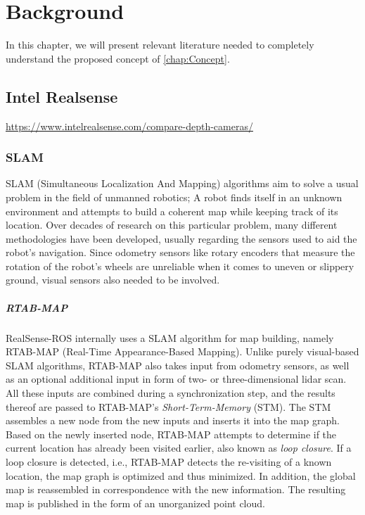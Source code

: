 \documentclass[main.tex]{subfiles}
\begin{document}
\chapter{Background}\label{chap:Background}
In this chapter, we will present relevant literature needed to completely understand the proposed concept of \autoref{chap:Concept}.


\section{Intel Realsense}
\href{https://www.intelrealsense.com/compare-depth-cameras/}{https://www.intelrealsense.com/compare-depth-cameras/}


\subsection*{SLAM}
SLAM (Simultaneous Localization And Mapping) algorithms aim to solve a usual problem in the field of unmanned robotics;
A robot finds itself in an unknown environment and attempts to build a coherent map while keeping track of its location.
Over decades of research on this particular problem, many different methodologies have been developed, usually regarding the sensors used to aid the robot's navigation.
Since odometry sensors like rotary encoders that measure the rotation of the robot's wheels are unreliable when it comes to uneven or slippery ground, visual sensors also needed to be involved.

\paragraph*{RTAB-MAP}
RealSense-ROS internally uses a SLAM algorithm for map building, namely RTAB-MAP (Real-Time Appearance-Based Mapping)\cite{Labbé_Michaud_2019}.
Unlike purely visual-based SLAM algorithms, RTAB-MAP also takes input from odometry sensors, as well as an optional additional input in form of two- or three-dimensional
lidar scan.
All these inputs are combined during a synchronization step, and the results thereof are passed to RTAB-MAP's \textit{Short-Term-Memory} (STM).
The STM assembles a new node from the new inputs and inserts it into the map graph. Based on the newly inserted node, RTAB-MAP attempts to determine if the current location has already been visited earlier, also known as \textit{loop closure}.
If a loop closure is detected, i.e., RTAB-MAP detects the re-visiting of a known location, the map graph is optimized and thus minimized. In addition, the global map is reassembled in correspondence with the new information.
The resulting map is published in the form of an unorganized point cloud.
\end{document}

